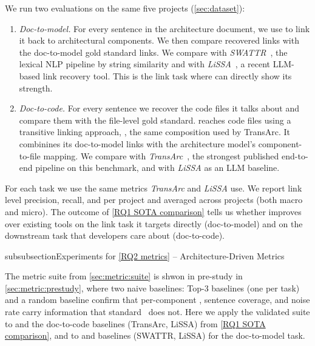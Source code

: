 We run two evaluations on the same five projects (\autoref{sec:dataset}):
\begin{enumerate}[leftmargin=*]
    \item \emph{Doc-to-model.} For every sentence in the architecture document, we use \approach to link it back to architectural components.
     We then compare recovered links with the doc-to-model gold standard links. 
    We compare \approach{} with \emph{SWATTR}~\cite{swattr}, the lexical NLP pipeline by string similarity and with \emph{LiSSA}~\cite{lissa}, a recent \ac{LLM}-based link recovery tool. 
    This is the link task where \approach{} can directly show its strength.
    \item \emph{Doc-to-code.} For every sentence we recover the code files it talks about and compare them with the file-level gold standard. 
    \approach{} reaches code files using a transitive linking approach, , the same composition used by TransArc.
    It combinines its doc-to-model links with the architecture model's component-to-file mapping. 
    We compare \approach{} with \emph{TransArc}~\cite{transarc}, the strongest published end-to-end pipeline on this benchmark, 
    and with \emph{LiSSA} as an \ac{LLM} baseline.
\end{enumerate}
For each task we use the same metrics \emph{TransArc} and \emph{LiSSA} use. 
We report link level precision, recall, and \fone per project and averaged across projects (both macro and micro).
The outcome of \ref{RQ1 SOTA comparison} tells us whether \approach{} improves over existing tools on the link task it targets directly (doc-to-model) and on the downstream task that developers care about (doc-to-code).

subsubsection{Experiments for \ref{RQ2 metrics} -- Architecture-Driven Metrics}
\label{sec:exp:rq2}

The metric suite from \autoref{sec:metric:suite} is shwon in pre-study in \autoref{sec:metric:prestudy}, 
where two naive baselines: Top-3 baselines (one per task) and a random baseline confirm that per-component \fone, sentence coverage, and noise rate carry information that standard \fone\ does not.
Here we apply the validated suite to \approach{} and the doc-to-code baselines (TransArc, LiSSA) from \ref{RQ1 SOTA comparison}, and to \approach{} and baselines (SWATTR, LiSSA) for the doc-to-model task.

